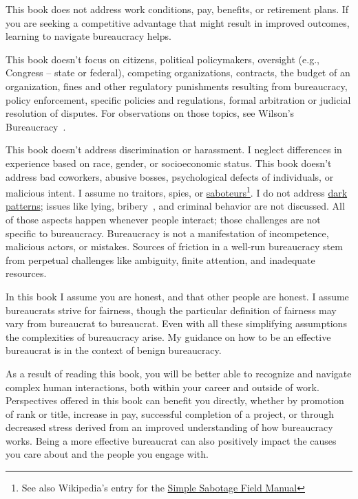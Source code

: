 This book does not address work conditions, pay, benefits, or retirement plans. If you are seeking a competitive advantage that might result in improved outcomes, learning to navigate bureaucracy helps.


This book doesn't focus on citizens, political policymakers, oversight (e.g., Congress -- state or federal), competing organizations, contracts, the budget of an organization, fines and other regulatory punishments resulting from bureaucracy, policy enforcement, specific policies and regulations, formal arbitration or judicial resolution of disputes. For observations on those topics, see Wilson's Bureaucracy~\cite{1991_Wilson}. 


This book doesn't address discrimination or harassment. I neglect differences in experience based on race, gender, or socioeconomic status. This book doesn't address bad coworkers, abusive bosses, psychological defects of individuals, or malicious intent. I assume no traitors, spies, 
or \href{https://www.hsdl.org/?abstract&did=750070}{saboteurs}\footnote{See also Wikipedia's entry for the \href{https://en.wikisource.org/wiki/Simple_Sabotage_Field_Manual}{Simple Sabotage Field Manual}
}.
I do not address \href{https://en.wikipedia.org/wiki/Dark_pattern}{dark patterns}; 
issues like lying, bribery~\cite{2021_Ang}, and criminal behavior are not discussed. All of those aspects happen whenever people interact; those challenges are not specific to bureaucracy. 
Bureaucracy is not a manifestation of incompetence, malicious actors, or mistakes. Sources of friction in a well-run bureaucracy stem from perpetual challenges like ambiguity, finite attention, and inadequate resources.


In this book I assume you are honest, and that other people are honest.  
I assume bureaucrats strive for fairness, though the particular definition of fairness may vary from bureaucrat to bureaucrat. 
Even with all these simplifying assumptions the complexities of bureaucracy arise. My guidance on how to be an effective bureaucrat is in the context of benign bureaucracy.


As a result of reading this book, you will be better able to recognize and navigate complex human interactions, both within your career and outside of work. Perspectives offered in this book can benefit you directly, whether by promotion of rank or title, increase in pay, successful completion of a project, or through decreased stress derived from an improved understanding of how bureaucracy works. Being a more effective bureaucrat can also positively impact the causes you care about and the people you engage with.






